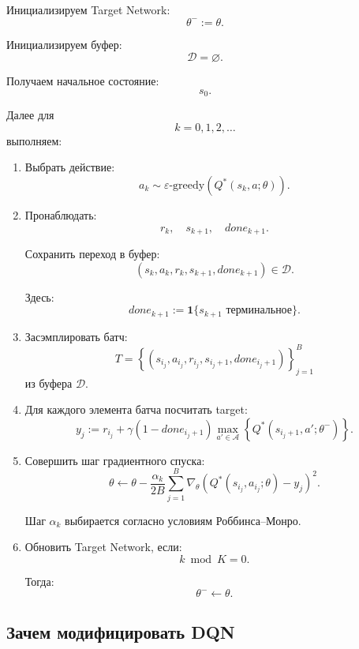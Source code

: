 \documentclass[12pt,a4paper]{article}
\begin{document}
Инициализируем Target Network:
\[
\theta^- := \theta.
\]

Инициализируем буфер:
\[
\mathcal D = \varnothing.
\]

Получаем начальное состояние:
\[
s_0.
\]

Далее для
\[
k=0,1,2,\ldots
\]
выполняем:

\begin{enumerate}
    \item Выбрать действие:
    \[
    a_k
    \sim
    \varepsilon\text{-greedy}
    \left(
    Q^\ast(s_k,a;\theta)
    \right).
    \]

    \item Пронаблюдать:
    \[
    r_k,\quad s_{k+1},\quad done_{k+1}.
    \]

    Сохранить переход в буфер:
    \[
    (s_k,a_k,r_k,s_{k+1},done_{k+1})
    \in
    \mathcal D.
    \]

    Здесь:
    \[
    done_{k+1}
    :=
    \mathbf 1\{s_{k+1}\text{ терминальное}\}.
    \]

    \item Засэмплировать батч:
    \[
    T
    =
    \left\{
    (s_{i_j},a_{i_j},r_{i_j},s_{i_j+1},done_{i_j+1})
    \right\}_{j=1}^{B}
    \]
    из буфера $\mathcal D$.

    \item Для каждого элемента батча посчитать target:
    \[
    y_j
    :=
    r_{i_j}
    +
    \gamma
    (1-done_{i_j+1})
    \max_{a' \in \mathcal A}
    \left\{
    Q^\ast(s_{i_j+1},a';\theta^-)
    \right\}.
    \]

    \item Совершить шаг градиентного спуска:
    \[
    \theta
    \leftarrow
    \theta
    -
    \frac{\alpha_k}{2B}
    \sum_{j=1}^{B}
    \nabla_\theta
    \left(
    Q^\ast(s_{i_j},a_{i_j};\theta)
    -
    y_j
    \right)^2.
    \]

    Шаг $\alpha_k$ выбирается согласно условиям Роббинса--Монро.

    \item Обновить Target Network, если:
    \[
    k \bmod K = 0.
    \]

    Тогда:
    \[
    \theta^- \leftarrow \theta.
    \]
\end{enumerate}

\subsection{Зачем модифицировать DQN}
\end{document}

